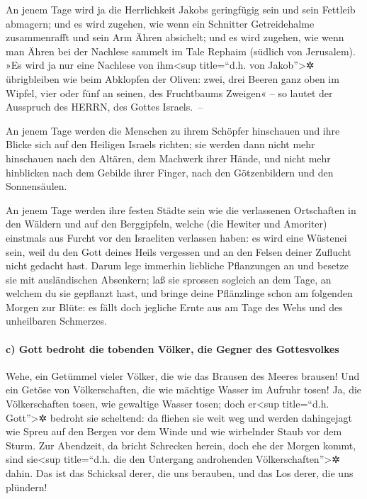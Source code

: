 An jenem Tage wird ja die Herrlichkeit Jakobs geringfügig
sein und sein Fettleib abmagern; und es wird zugehen, wie
wenn ein Schnitter Getreidehalme zusammenrafft und sein Arm Ähren
absichelt; und es wird zugehen, wie wenn man Ähren bei der Nachlese
sammelt im Tale Rephaim (südlich von Jerusalem). »Es wird
ja nur eine Nachlese von ihm\textless sup title=``d.h. von
Jakob''\textgreater✲ übrigbleiben wie beim Abklopfen der Oliven: zwei,
drei Beeren ganz oben im Wipfel, vier oder fünf an seinen, des
Fruchtbaums Zweigen« -- so lautet der Ausspruch des HERRN, des Gottes
Israels.~--

An jenem Tage werden die Menschen zu ihrem Schöpfer
hinschauen und ihre Blicke sich auf den Heiligen Israels richten;
sie werden dann nicht mehr hinschauen nach den Altären,
dem Machwerk ihrer Hände, und nicht mehr hinblicken nach dem Gebilde
ihrer Finger, nach den Götzenbildern und den Sonnensäulen.

An jenem Tage werden ihre festen Städte sein wie die
verlassenen Ortschaften in den Wäldern und auf den Berggipfeln, welche
(die Hewiter und Amoriter) einstmals aus Furcht vor den Israeliten
verlassen haben: es wird eine Wüstenei sein, weil du den
Gott deines Heils vergessen und an den Felsen deiner Zuflucht nicht
gedacht hast. Darum lege immerhin liebliche Pflanzungen an und besetze
sie mit ausländischen Absenkern; laß sie sprossen
sogleich an dem Tage, an welchem du sie gepflanzt hast, und bringe deine
Pflänzlinge schon am folgenden Morgen zur Blüte: es fällt doch jegliche
Ernte aus am Tage des Wehs und des unheilbaren Schmerzes.

\hypertarget{c-gott-bedroht-die-tobenden-vuxf6lker-die-gegner-des-gottesvolkes}{%
\paragraph{c) Gott bedroht die tobenden Völker, die Gegner des
Gottesvolkes}\label{c-gott-bedroht-die-tobenden-vuxf6lker-die-gegner-des-gottesvolkes}}

Wehe, ein Getümmel vieler Völker, die wie das Brausen des
Meeres brausen! Und ein Getöse von Völkerschaften, die wie mächtige
Wasser im Aufruhr tosen! Ja, die Völkerschaften tosen,
wie gewaltige Wasser tosen; doch er\textless sup title=``d.h.
Gott''\textgreater✲ bedroht sie scheltend: da fliehen sie weit weg und
werden dahingejagt wie Spreu auf den Bergen vor dem Winde und wie
wirbelnder Staub vor dem Sturm. Zur Abendzeit, da bricht
Schrecken herein, doch ehe der Morgen kommt, sind sie\textless sup
title=``d.h. die den Untergang androhenden Völkerschaften''\textgreater✲
dahin. Das ist das Schicksal derer, die uns berauben, und das Los derer,
die uns plündern!

